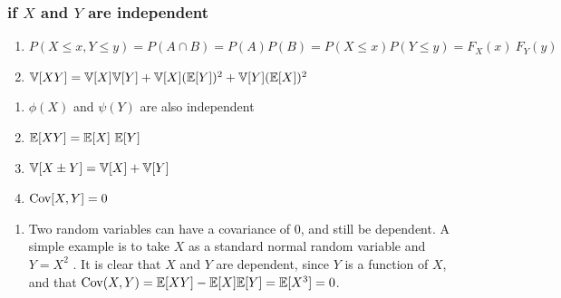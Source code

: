 \subsubsection{if $X$ and $Y$ are independent}



\begin{enumerate}[resume*=calcrulesrv]
    \item
    $
        P(X \leq x, Y \leq y)
        = P(A \cap B)
        = P(A) P(B)
        = P(X \leq x) P(Y \leq y)
        = F _X (x)\ F_Y (y)
    $
    \hfill \cite{statistics/book/Statistics-for-Data-Scientists/Maurits-Kaptein}

    \item
    $
        \mathbb{V}[X Y]
        = \mathbb{V}[X] \mathbb{V}[Y] + \mathbb{V}[X](\mathbb{E}[Y])^2 + \mathbb{V}[Y](\mathbb{E}[X])^2
    $
    \hfill \cite{statistics/book/Statistics-for-Data-Scientists/Maurits-Kaptein}
\end{enumerate}


\begin{multicols}{2}
\begin{enumerate}[resume*=calcrulesrv]
    \item $\phi(X)$ and $\psi(Y)$ are also independent
    \hfill \cite{statistics/book/Statistics-for-Data-Scientists/Maurits-Kaptein}

    \item $\mbbE[X Y]  = \mbbE[X]\ \mbbE[Y]$
    \hfill \cite{statistics/book/Statistics-for-Data-Scientists/Maurits-Kaptein}

    \item $\mathbb{V}[X \pm Y] = \mathbb{V}[X] + \mathbb{V}[Y]$
    \hfill \cite{statistics/book/Statistics-for-Data-Scientists/Maurits-Kaptein}

    \item $\text{Cov}[X, Y] = 0$
    \hfill \cite{statistics/book/Statistics-for-Data-Scientists/Maurits-Kaptein}
\end{enumerate}
\end{multicols}



\begin{enumerate}[resume*=calcrulesrv]
    \item Two random variables can have a covariance of $0$, and still be dependent. 
    A simple example is to take $X$ as a standard normal random variable and $Y = X^2$ . 
    It is clear that $X$ and $Y$ are dependent, since $Y$ is a function of $X$, and that $\text{Cov}(X, Y ) = \mathbb{E}[X Y] - \mathbb{E}[X] \mathbb{E}[Y] = \mathbb{E}[X^3] = 0$.
    \hfill \cite{statistics/book/Statistics-for-Data-Scientists/Maurits-Kaptein}
\end{enumerate}




